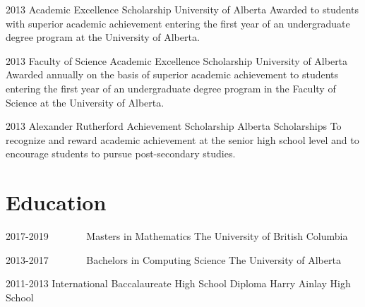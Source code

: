 \documentclass{friggeri-cv}
\begin{document}
\begin{entrylist}
\entry
{2013}
{Academic Excellence Scholarship}
{University of Alberta}
{Awarded to students with superior academic achievement entering the first year of an undergraduate degree program at the University of Alberta.}


\entry
{2013}
{Faculty of Science Academic Excellence Scholarship}
{University of Alberta}
{Awarded annually on the basis of superior academic achievement to students entering the first year of an undergraduate degree program in the Faculty of Science at the University of Alberta.}


\entry
{2013}
{Alexander Rutherford Achievement Scholarship}
{Alberta Scholarships}
{To recognize and reward academic achievement at the senior high school level and to encourage students to pursue post-secondary studies.}


\end{entrylist}



\section{Education}

\begin{entrylist}


\entry
{2017-2019\ \ \ \ \ \ \ }
{Masters {\normalfont in Mathematics}}
{The University of British Columbia}


\entry
{2013-2017\ \ \ \ \ \ \ }
{Bachelors {\normalfont in Computing Science}}
{The University of Alberta}


\entry
{2011-2013}
{International Baccalaureate {\normalfont High School Diploma}}
{Harry Ainlay High School}


\end{entrylist}
\end{document}
